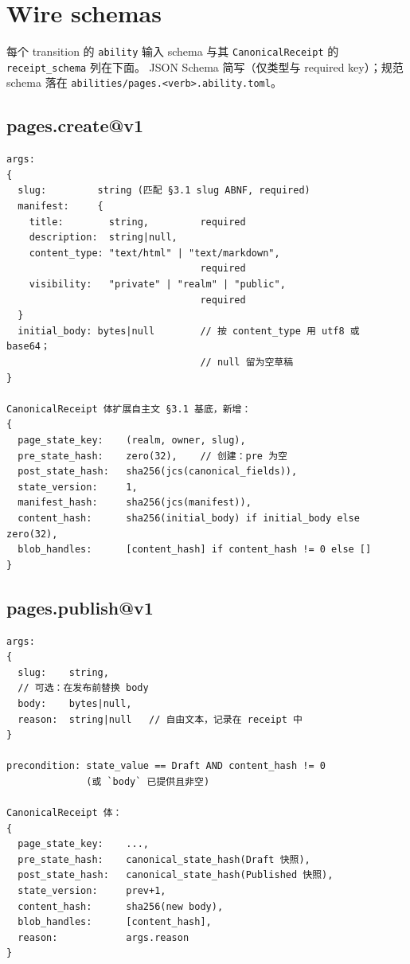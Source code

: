 \documentclass[11pt,a4paper]{article}
\theoremstyle{definition}
\begin{document}
\section{Wire schemas}
\label{sec:wire-schemas}

每个 transition 的 \texttt{ability} 输入 schema 与其
\texttt{CanonicalReceipt} 的 \texttt{receipt\_schema} 列在下面。
JSON Schema 简写（仅类型与 required key）；规范 schema 落在
\texttt{abilities/pages.<verb>.ability.toml}。

\subsection{pages.create@v1}

\begin{lstlisting}
args:
{
  slug:         string (匹配 §3.1 slug ABNF, required)
  manifest:     {
    title:        string,         required
    description:  string|null,
    content_type: "text/html" | "text/markdown",
                                  required
    visibility:   "private" | "realm" | "public",
                                  required
  }
  initial_body: bytes|null        // 按 content_type 用 utf8 或 base64；
                                  // null 留为空草稿
}

CanonicalReceipt 体扩展自主文 §3.1 基底，新增：
{
  page_state_key:    (realm, owner, slug),
  pre_state_hash:    zero(32),    // 创建：pre 为空
  post_state_hash:   sha256(jcs(canonical_fields)),
  state_version:     1,
  manifest_hash:     sha256(jcs(manifest)),
  content_hash:      sha256(initial_body) if initial_body else zero(32),
  blob_handles:      [content_hash] if content_hash != 0 else []
}
\end{lstlisting}

\subsection{pages.publish@v1}

\begin{lstlisting}
args:
{
  slug:    string,
  // 可选：在发布前替换 body
  body:    bytes|null,
  reason:  string|null   // 自由文本，记录在 receipt 中
}

precondition: state_value == Draft AND content_hash != 0
              (或 `body` 已提供且非空)

CanonicalReceipt 体：
{
  page_state_key:    ...,
  pre_state_hash:    canonical_state_hash(Draft 快照),
  post_state_hash:   canonical_state_hash(Published 快照),
  state_version:     prev+1,
  content_hash:      sha256(new body),
  blob_handles:      [content_hash],
  reason:            args.reason
}
\end{lstlisting}
\end{document}
